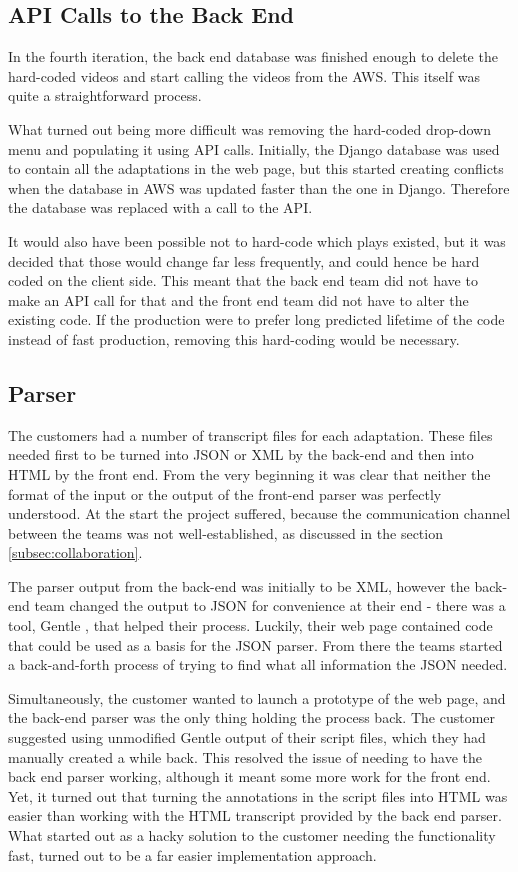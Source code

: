 \documentclass{l3proj}
\begin{document}
\subsection{API Calls to the Back End}
In the fourth iteration, the back end database was finished enough to delete the hard-coded videos and start calling the videos from the AWS. This itself was quite a straightforward process.

What turned out being more difficult was removing the hard-coded drop-down menu and populating it using API calls. Initially, the Django database was used to contain all the adaptations in the web page, but this started creating conflicts when the database in AWS was updated faster than the one in Django. Therefore the database was replaced with a call to the API.

It would also have been possible not to hard-code which plays existed, but it was decided that those would change far less frequently, and could hence be hard coded on the client side.  This meant that the back end team did not have to make an API call for that and the front end team did not have to alter the existing code. If the production were to prefer long predicted lifetime of the code instead of fast production, removing this hard-coding would be necessary.


\subsection{Parser}
The customers had a number of transcript files for each adaptation. These files needed first to be turned into JSON or XML by the back-end and then into HTML by the front end. From the very beginning it was clear that neither the format of the input or the output of the front-end parser was perfectly understood. At the start the project suffered, because the communication channel between the teams was not well-established, as discussed in the section \ref{subsec:collaboration}.

The parser output from the back-end was initially to be XML, however the back-end team changed the output to JSON for convenience at their end - there was a tool, Gentle \cite{gentle}, that helped their process. Luckily, their web page contained code that could be used as a basis for the JSON parser.  From there the teams started a back-and-forth process of trying to find what all information the JSON needed. 

Simultaneously, the customer wanted to launch a prototype of the web page, and the back-end parser was the only thing holding the process back. The customer suggested using unmodified Gentle output of their script files, which they had manually created a while back. This resolved the issue of needing to have the back end parser working, although it meant some more work for the front end. Yet, it turned out that turning the annotations in the script files into HTML was easier than working with the HTML transcript provided by the back end parser. What started out as a hacky solution to the customer needing the functionality fast, turned out to be a far easier implementation approach.
\end{document}
